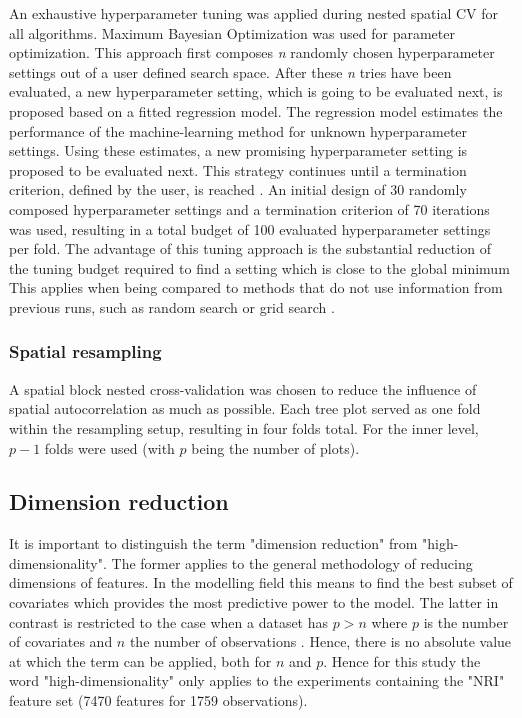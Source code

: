 \documentclass[review]{elsarticle}
\begin{document}
An exhaustive hyperparameter tuning was applied during nested spatial \ac{CV} for all algorithms.
Maximum Bayesian Optimization \citep{mlrmbo} was used for parameter optimization.
This approach first composes \textit{n} randomly chosen hyperparameter settings out of a user defined search space.
After these \textit{n} tries have been evaluated, a new hyperparameter setting, which is going to be evaluated next, is proposed based on a fitted regression model.
The regression model estimates the performance of the machine-learning method for unknown hyperparameter settings.
Using these estimates, a new promising hyperparameter setting is proposed to be evaluated next.
This strategy continues until a termination criterion, defined by the user, is reached \citep{hutter2011, jones1998}.
An initial design of 30 randomly composed hyperparameter settings and a termination criterion of 70 iterations was used, resulting in a total budget of 100 evaluated hyperparameter settings per fold.
The advantage of this tuning approach is the substantial reduction of the tuning budget required to find a setting which is close to the global minimum
This applies when being compared to methods that do not use information from previous runs, such as random search or grid search \citep{bergstra2012}.

\subsubsection{Spatial resampling}

A spatial block nested cross-validation was chosen to reduce the influence of spatial autocorrelation as much as possible.
Each tree plot served as one fold within the resampling setup, resulting in four folds total.
For the inner level, $p - 1$ folds were used (with $p$ being the number of plots).

\subsection{Dimension reduction}

It is important to distinguish the term "dimension reduction" from "high-dimensionality".
The former applies to the general methodology of reducing dimensions of features.
In the modelling field this means to find the best subset of covariates which provides the most predictive power to the model.
The latter in contrast is restricted to the case when a dataset has $p > n$ where $p$ is the number of covariates and $n$ the number of observations \citep{Hastie2001}.
Hence, there is no absolute value at which the term can be applied, both for $n$ and $p$.
Hence for this study the word "high-dimensionality" only applies to the experiments containing the "NRI" feature set (7470 features for 1759 observations).
\end{document}

